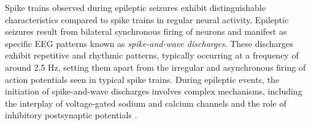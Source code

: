 \documentclass[a4paper, UKenglish, 11pt]{uiomaster}
\begin{document}
Spike trains observed during epileptic seizures exhibit distinguishable characteristics compared to spike trains in regular neural activity. Epileptic seizures result from bilateral synchronous firing of neurons and manifest as specific EEG patterns known as \emph{spike-and-wave discharges}. These discharges exhibit repetitive and rhythmic patterns, typically occurring at a frequency of around 2.5 Hz, setting them apart from the irregular and asynchronous firing of action potentials seen in typical spike trains\cite{gerstner2014neuronal}. During epileptic events, the initiation of spike-and-wave discharges involves complex mechanisms, including the interplay of voltage-gated sodium and calcium channels and the role of inhibitory postsynaptic potentials \cite{wiki:electroencephalography}. 


\end{document}
